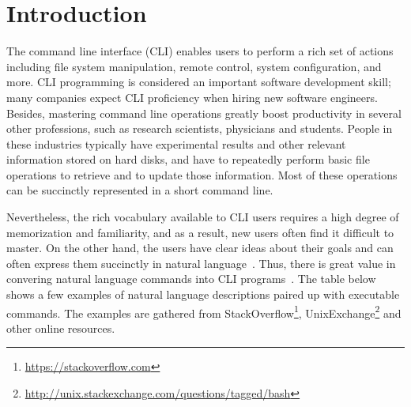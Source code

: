 \section{Introduction}


The command line interface (CLI) enables users to perform a rich set of actions including file system manipulation, remote control, system configuration, and more. CLI programming is considered an important software development skill; many companies expect CLI proficiency when hiring new software engineers. Besides, mastering command line operations greatly boost productivity in several other professions, such as research scientists, physicians and students. People in these industries typically have experimental results and other relevant information stored on hard disks, and have to repeatedly perform basic file operations to retrieve and to update those information. Most of these operations can be succinctly represented in a short command line.

Nevertheless, the rich vocabulary available to CLI users requires a high degree of memorization and familiarity, and as a result, new users often find it difficult to master. On the other hand, %
the users have clear ideas about their goals and can often express them succinctly in natural language~\cite{Myers:2004:NPL:1015864.1015888}. Thus, there is great value in convering natural language commands into CLI programs~\cite{Pederson-Report,Manaris:1994:DNL:198125.198137,ZOLTANFORD1991527}. The table below shows a few examples of natural language descriptions paired up with executable commands. The examples are gathered from StackOverflow\footnote{\url{https://stackoverflow.com}}, UnixExchange\footnote{\url{http://unix.stackexchange.com/questions/tagged/bash}} and other online resources.

